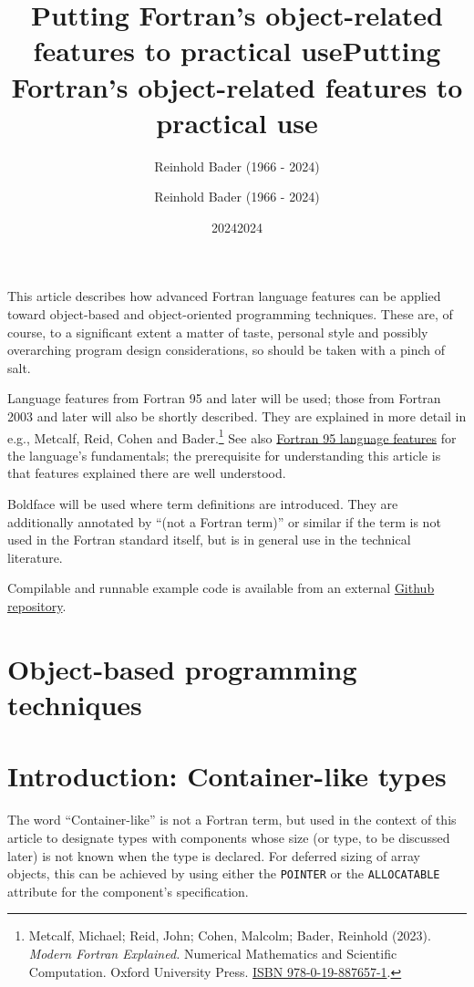 \documentclass[
  paper=a4,
  ,captions=tableheading
]{scrartcl}
\title{Putting Fortran's object-related features to practical use}
\author{Reinhold Bader (1966 - 2024)}
\date{2024}
\title{Putting Fortran's object-related features to practical use}
\author{Reinhold Bader (1966 - 2024)}
\date{2024}
\newcommand{\passthrough}[1]{#1}
\begin{document}




{
\setcounter{tocdepth}{3}
\tableofcontents
}
This article describes how advanced Fortran language features can be
applied toward object-based and object-oriented programming techniques.
These are, of course, to a significant extent a matter of taste,
personal style and possibly overarching program design considerations,
so should be taken with a pinch of salt.

Language features from Fortran 95 and later will be used; those from
Fortran 2003 and later will also be shortly described. They are
explained in more detail in e.g., Metcalf, Reid, Cohen and
Bader.\footnote{Metcalf, Michael; Reid, John; Cohen, Malcolm; Bader,
  Reinhold (2023). \emph{Modern Fortran Explained.} Numerical
  Mathematics and Scientific Computation. Oxford University Press.
  \href{https://en.wikipedia.org/wiki/Special:BookSources/978-0-19-887657-1}{ISBN
  978-0-19-887657-1}.} See also
\href{https://en.wikipedia.org/wiki/Fortran_95_language_features}{Fortran
95 language features} for the language's fundamentals; the prerequisite
for understanding this article is that features explained there are well
understood.

Boldface will be used where term definitions are introduced. They are
additionally annotated by ``(not a Fortran term)'' or similar if the
term is not used in the Fortran standard itself, but is in general use
in the technical literature.

Compilable and runnable example code is available from an external
\href{https://github.com/reinh-bader/object_fortran}{Github repository}.

\section{Object-based programming techniques}\label{sec:oop_techniques}

\section{Introduction: Container-like
types}\label{introduction-container-like-types}

The word ``Container-like'' is not a Fortran term, but used in the
context of this article to designate types with components whose size
(or type, to be discussed later) is not known when the type is declared.
For deferred sizing of array objects, this can be achieved by using
either the \passthrough{\lstinline!POINTER!} or the
\passthrough{\lstinline!ALLOCATABLE!} attribute for the component's
specification.
\end{document}
